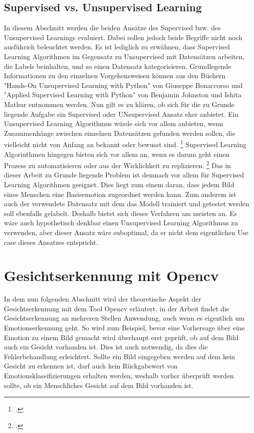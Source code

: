 \documentclass[12pt, a4paper]{scrbook}
\begin{document}
\subsection{Supervised vs. Unsupervised Learning}
In diesem Abschnitt werden die beiden Ansätze des Supervised bzw. des Unsupervised Learnings evaluiert. Dabei sollen jedoch beide Begriffe nicht noch ausführich beleuchtet werden. Es ist lediglich zu erwähnen, dass Supervised Learning Algorithmen im Gegensatz zu Unsupervised mit Datensätzen arbeiten, die Labels beinhalten, und so einen Datensatz kategorisieren.  Grundlegende Informationen zu den einzelnen Vorgehensweisen  können aus den Büchern "Hands-On Unsupervised Learning with Python" von Giuseppe Bonaccorso und "Applied Supervised Learning with Python" von Benjamin Johnston und Ishita Mathur entnommen werden.
Nun gilt es zu klären, ob sich für die zu Grunde liegende Aufgabe ein Supervised oder UNsupervised Ansatz eher anbietet. Ein Unsupervised Learning Algorithmus würde sich vor allem anbieten, wenn Zusammenhänge zwischen einzelnen Datensätzen gefunden werden sollen, die vielleicht nicht von Anfang an bekannt oder bewusst sind.
\footcite[Vgl. ][21]{Unsupervised}
 Supervised Learning Algoriuthmen hingegen bieten sich vor allem an, wenn es darum geht einen Prozess zu automatisieren oder aus der Wirklichkeit zu replizieren.
\footcite[Vgl. ][4]{Supervised}
Das in dieser Arbeit zu Grunde liegende Problem ist demnach vor allem für Supervised Learning Algorithmen geeignet. Dies liegt zum einem daran, dass jedem Bild eines Menschen eine Basisemotion zugeordnet werden kann. Zum anderem ist auch der verwendete Datensatz mit dem das Modell trainiert und getestet werden soll ebenfalls gelabelt. Deshalb bietet sich dieses Verfahren am meisten an. Es wäre auch hypothetisch denkbar einen Unsupervised Learning Algorithmus zu verwenden, aber dieser Ansatz wäre suboptimal, da er nicht dem eigentlichen Use case dieses Ansatzes entspricht.

\section{Gesichtserkennung mit Opencv}
In dem nun folgenden Abschnitt wird der theoretische Aspekt der Gesichtserkennung mit dem Tool Opencv erläutert. in der Arbeit findet die Gesichtserkennung an mehreren Stellen Anwendung, auch wenn es eigentlich um Emotionserkennung geht. So wird zum Beispiel, bevor eine Vorhersage über eine Emotion zu einem Bild gemacht wird überhaupt erst geprüft, ob auf dem Bild auch ein Gesicht vorhanden ist. Dies ist auch notwendig, da dies die Fehlerbehandlung erleichtert. Sollte ein Bild eingegeben werden auf dem kein Gesicht zu erkennen ist, darf auch kein Rückgabewert von Emotionsklassifizierungen erhalten werden, weshalb vorher überprüft werden sollte, ob ein Menschliches Gesicht auf dem Bild vorhanden ist.
\end{document}
